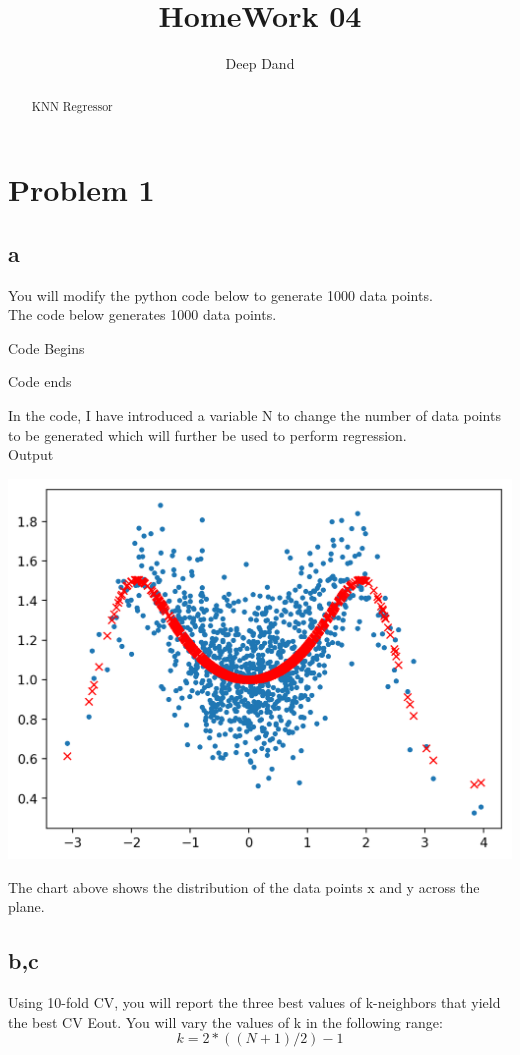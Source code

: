 \documentclass[10pt]{article}         %
\title{HomeWork 04}
\author{Deep Dand}
\begin{document}
\maketitle

\begin{abstract}
KNN Regressor
\end{abstract}

\section{Problem 1}
\subsection{a}
You will modify the python code below to generate 1000 data points.
\\The code below generates 1000 data points. 

Code Begins

Code ends

In the code, I have introduced a variable N to change the number of data points to be generated which will further be used to perform regression. 
\\Output\\
\begin{center}
\includegraphics[scale=0.45]{HW4_PartA.png}
\end{center}
The chart above shows the distribution of the data points x and y across the plane.


\subsection{b,c}
Using 10-fold CV, you will report the three best values of k-neighbors that yield the best CV
Eout. You will vary the values of k in the following range: $$k = 2 * ((N+1)/2) - 1$$
\end{document}
